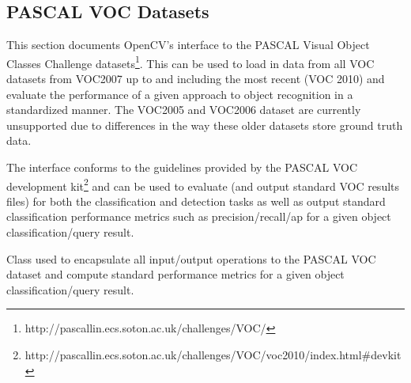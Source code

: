 \subsection{PASCAL VOC Datasets}

This section documents OpenCV's interface to the PASCAL Visual Object Classes Challenge datasets\footnote{http://pascallin.ecs.soton.ac.uk/challenges/VOC/}. This can be used to load in data from all VOC datasets from VOC2007 up to and including the most recent (VOC 2010) and evaluate the performance of a given approach to object recognition in a standardized manner. The VOC2005 and VOC2006 dataset are currently unsupported due to differences in the way these older datasets store ground truth data.

The interface conforms to the guidelines provided by the PASCAL VOC development kit\footnote{http://pascallin.ecs.soton.ac.uk/challenges/VOC/voc2010/index.html\#devkit} and can be used to evaluate (and output standard VOC results files) for both the classification and detection tasks as well as output standard classification performance metrics such as precision/recall/ap for a given object classification/query result.

Class used to encapsulate all input/output operations to the PASCAL VOC dataset and compute standard performance metrics for a given object classification/query result.

